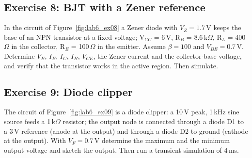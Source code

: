 

\subsection{Exercise 8: BJT with a Zener reference}
In the circuit of Figure~\ref{fig:lab6_ex08} a Zener diode with $V_Z=1.7$\,V keeps the base of an NPN transistor at a fixed voltage; V$_{CC}$ = 6\,V, R$_B$ = 8.6\,k$\Omega$, R$_L$ = 400\,$\Omega$ in the collector, R$_E$ = 100\,$\Omega$ in the emitter. Assume $\beta=100$ and $V_{BE}=0.7$\,V. Determine $V_E$, $I_E$, $I_C$, $I_B$, $V_{CE}$, the Zener current and the collector-base voltage, and verify that the transistor works in the active region. Then simulate.






\subsection{Exercise 9: Diode clipper}
The circuit of Figure~\ref{fig:lab6_ex09} is a diode clipper: a 10\,V peak, 1\,kHz sine source feeds a 1\,k$\Omega$ resistor; the output node is connected through a diode D1 to a 3\,V reference (anode at the output) and through a diode D2 to ground (cathode at the output). With $V_F=0.7$\,V determine the maximum and the minimum output voltage and sketch the output. Then run a transient simulation of 4\,ms.

